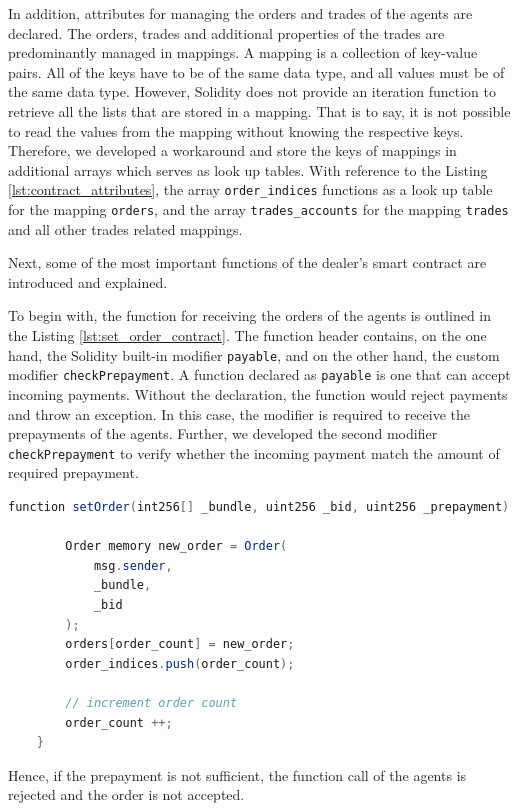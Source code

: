 In addition, attributes for managing the orders and trades of the agents are declared. 
The orders, trades and additional properties of the trades are predominantly managed in mappings.
A mapping is a collection of key-value pairs. All of the keys have to be of the same data type, and 
all values must be of the same data type. However, Solidity does not provide an iteration
function to retrieve all the lists that are stored in a mapping. 
That is to say, it is not possible to read the values from the mapping without knowing the respective keys.
Therefore, we developed a workaround and store the keys of mappings in additional arrays which serves 
as look up tables.
With reference to the Listing \ref{lst:contract_attributes}, the array \verb|order_indices| functions as a 
look up table for the mapping \verb|orders|, and the array \verb|trades_accounts| for the mapping 
\verb|trades| and all other trades related mappings.

Next, some of the most important functions of the dealer's smart contract are introduced and explained.

To begin with, the function for receiving the orders of the agents is outlined in the Listing \ref{lst:set_order_contract}.
The function header contains, on the one hand, the Solidity built-in modifier \verb|payable|, and on the other hand, the custom
modifier \verb|checkPrepayment|. A function declared as \verb|payable| is one that can accept incoming payments. 
Without the declaration, the function would reject payments and throw an exception. In this case, the modifier is required 
to receive the prepayments of the agents. 
Further, we developed the second modifier \verb|checkPrepayment| to verify whether the incoming payment match the amount
of required prepayment.

\begin{lstlisting}[float=htbp, label=lst:set_order_contract, caption=Receiving agents orders, language=Java]
    function setOrder(int256[] _bundle, uint256 _bid, uint256 _prepayment) public payable checkPrepayment(_prepayment) {

        Order memory new_order = Order(
            msg.sender,
            _bundle,
            _bid
        );
        orders[order_count] = new_order;
        order_indices.push(order_count);

        // increment order count
        order_count ++;
    }
\end{lstlisting}

Hence, if the prepayment is not sufficient, the function call of the agents is rejected and 
the order is not accepted.

